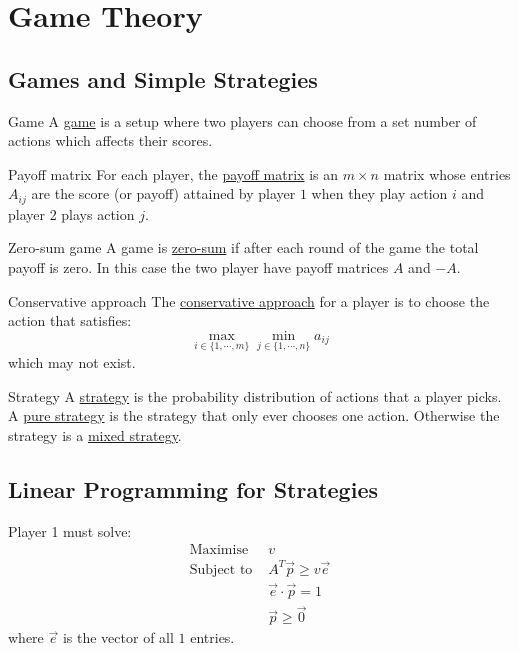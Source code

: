 \documentclass[../Main.tex]{subfiles}
\begin{document}
\section{Game Theory}
\subsection{Games and Simple Strategies}
\begin{definition}{Game}
    A \underline{game} is a setup where two players can choose from a set number of actions which affects their scores.
\end{definition}
\begin{definition}{Payoff matrix}
    For each player, the \underline{payoff matrix} is an $m \times n$ matrix whose entries $A_{ij}$ are the score (or payoff) attained by player $1$ when they play action $i$ and player 2 plays action $j$.
\end{definition}
\begin{definition}{Zero-sum game}
    A game is \underline{zero-sum} if after each round of the game the total payoff is zero. In this case the two player have payoff matrices $A$ and $-A$.
\end{definition}
\begin{definition}{Conservative approach}
    The \underline{conservative approach} for a player is to choose the action that satisfies:
    \begin{equation*}
        \max_{i \in \{1, \cdots, m\}} \min_{j \in \{1, \cdots, n\}} a_{ij}
    \end{equation*}
    which may not exist.
\end{definition}
\begin{definition}{Strategy}
    A \underline{strategy} is the probability distribution of actions that a player picks. A \underline{pure strategy} is the strategy that only ever chooses one action. Otherwise the strategy is a \underline{mixed strategy}.
\end{definition}
\subsection{Linear Programming for Strategies}
Player 1 must solve:
\begin{align*}
    \text{Maximise } &v \\
    \text{Subject to } & A^T \vec{p} \geq v\vec{e} \\
    & \vec{e} \cdot \vec{p} = 1 \\
    & \vec{p} \geq \vec{0}
\end{align*}
where $\vec{e}$ is the vector of all $1$ entries.
\end{document}
